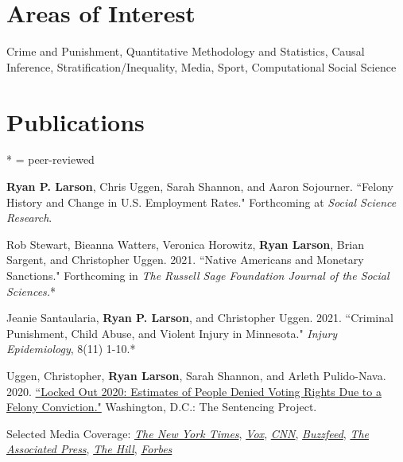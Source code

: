 \documentclass[letterpaper]{article}
\renewenvironment{itemize}{
  \begin{list}{}{
    \setlength{\leftmargin}{1.5em}
  }
}{
  \end{list}
}
\begin{document}
\section*{\textbf{Areas of Interest}}

Crime and Punishment,  Quantitative Methodology and Statistics, Causal Inference, Stratification/Inequality, Media, Sport, Computational Social Science


\section*{\textbf{Publications}} * = peer-reviewed 

\begin{itemize}

\item  \textbf{Ryan P. Larson}, Chris Uggen, Sarah Shannon, and Aaron Sojourner. ``Felony History and Change in U.S. Employment Rates." Forthcoming at \textit{Social Science Research}.

\item Rob Stewart, Bieanna Watters, Veronica Horowitz, \textbf{Ryan Larson}, Brian Sargent, and Christopher Uggen. 2021. ``Native Americans and Monetary Sanctions." Forthcoming in \textit{The Russell Sage Foundation Journal of the Social Sciences.}*

\item  Jeanie Santaularia, \textbf{Ryan P. Larson}, and Christopher Uggen. 2021. ``Criminal Punishment, Child Abuse, and Violent Injury in Minnesota." \textit{Injury Epidemiology}, 8(11) 1-10.*

\item Uggen, Christopher, \textbf{Ryan Larson}, Sarah Shannon, and Arleth Pulido-Nava. 2020. \href{https://www.sentencingproject.org/publications/locked-out-2020-estimates-of-people-denied-voting-rights-due-to-a-felony-conviction/}{``Locked Out 2020: Estimates of People Denied Voting Rights Due to a Felony Conviction."} Washington, D.C.: The Sentencing Project.
\begin{itemize}
\item Selected Media Coverage: \href{https://www.nytimes.com/live/2020/10/18/us/trump-vs-biden}{\textit{The New York Times}}, \href{https://www.vox.com/2020/10/14/21515850/voting-rights-sentencing-project-felon-disenfranchisement}{\textit{Vox}}, \href{https://www.cnn.com/2020/10/15/us/felony-convictions-voting-sentencing-project-study/index.html}{\textit{CNN}}, \href{https://www.buzzfeednews.com/article/skbaer/millions-cant-vote-2020-election-felony-convictions}{\textit{Buzzfeed}},  \href{https://apnews.com/article/election-2020-race-and-ethnicity-voting-rights-elections-tennessee-1467837105617bfd351b7b9969dc1683}{\textit{The Associated Press}}, \href{https://thehill.com/opinion/campaign/527510-thousands-of-people-with-felony-convictions-wont-be-able-to-vote-in-ga-run}{\textit{The Hill}}, \href{https://www.forbes.com/sites/joewalsh/2020/10/14/over-5-million-americans-wont-be-able-to-vote-next-month-because-of-criminal-records/?sh=3d0984982fc5}{\textit{Forbes}}
\end{itemize}


\end{itemize}
\end{document}
